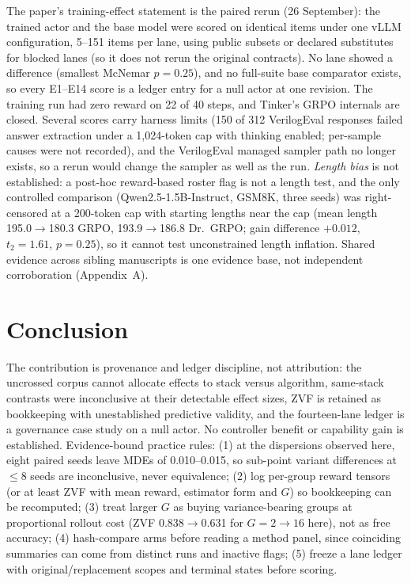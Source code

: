 \documentclass[conference]{IEEEtran}
\begin{document}
The paper's training-effect statement is the paired rerun (26 September):
the trained actor and the base model were scored on identical items under
one vLLM configuration, 5--151 items per lane, using public subsets or
declared substitutes for blocked lanes (so it does not rerun the original
contracts). No lane showed a difference (smallest McNemar $p=0.25$), and no
full-suite base comparator exists, so every E1--E14 score is a ledger entry
for a null actor at one revision. The training run had zero reward on 22 of
40 steps, and Tinker's GRPO internals are closed. Several scores carry
harness limits (150 of 312 VerilogEval responses failed answer extraction
under a 1,024-token cap with thinking enabled; per-sample causes were not
recorded), and the VerilogEval managed sampler path no longer exists, so a
rerun would change the sampler as well as the run. \emph{Length bias} is
not established: a post-hoc reward-based roster flag is not a length test,
and the only controlled comparison (Qwen2.5-1.5B-Instruct, GSM8K, three
seeds) was right-censored at a 200-token cap with starting lengths near the
cap (mean length 195.0$\to$180.3 GRPO, 193.9$\to$186.8 Dr.\ GRPO; gain
difference $+0.012$, $t_2=1.61$, $p=0.25$), so it cannot test unconstrained
length inflation. Shared evidence across sibling manuscripts is one
evidence base, not independent corroboration (Appendix~A).

\section{Conclusion}
The contribution is provenance and ledger discipline, not attribution: the
uncrossed corpus cannot allocate effects to stack versus algorithm,
same-stack contrasts were inconclusive at their detectable effect sizes,
ZVF is retained as bookkeeping with unestablished predictive validity, and
the fourteen-lane ledger is a governance case study on a null actor. No
controller benefit or capability gain is established. Evidence-bound
practice rules: (1) at the dispersions observed here, eight paired seeds
leave MDEs of 0.010--0.015, so sub-point variant differences at $\le$8
seeds are inconclusive, never equivalence; (2) log per-group reward tensors
(or at least ZVF with mean reward, estimator form and $G$) so bookkeeping
can be recomputed; (3) treat larger $G$ as buying variance-bearing groups
at proportional rollout cost (ZVF 0.838$\to$0.631 for $G=2\to16$ here),
not as free accuracy; (4) hash-compare arms before reading a method panel,
since coinciding summaries can come from distinct runs and inactive flags;
(5) freeze a lane ledger with original/replacement scopes and terminal
states before scoring.
\end{document}

